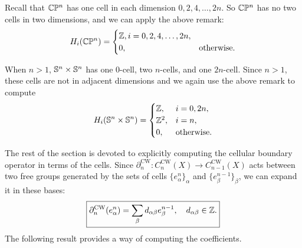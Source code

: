\begin{example}
    Recall that $\mathbb{C}\mathbb{P}^n$ has one cell in each dimension $0,2,4,\ldots,2n$. So $\mathbb{C}\mathbb{P}^n$ has no two cells in two dimensions, and we can apply the above remark:
    \[H_i(\mathbb{C}\mathbb{P}^n)=\begin{cases}
        \mathbb{Z}, i=0,2,4,\ldots,2n,\\
        0,&\text{otherwise}.
    \end{cases}\]
\end{example}
\begin{example}
    When $n>1$, $\mathbb{S}^n\times \mathbb{S}^n$ has one $0$-cell, two $n$-cells, and one $2n$-cell. Since $n>1$, these cells are not in adjacent dimensions and we again use the above remark to compute
    \[H_i(\mathbb{S}^n\times \mathbb{S}^n)=\begin{cases}
        \mathbb{Z},& i=0,2n,\\
        \mathbb{Z}^2,&i=n,\\
        0,&\text{otherwise}.
    \end{cases}\]
\end{example}


The rest of the section is devoted to explicitly computing the cellular boundary operator in terms of the cells. Since $\partial_n^{\mathrm{CW}}:C_n^{\mathrm{CW}}(X)\to C_{n-1}^{\mathrm{CW}}(X)$ acts between two free groups generated by the sets of cells $\{e^n_\alpha\}_\alpha$ and $\{e^{n-1}_\beta\}_\beta$, we can expand it in these bases:
\[\boxed{\partial_n^{\mathrm{CW}}(e_\alpha^n)=\sum_\beta d_{\alpha\beta}e_\beta^{n-1},\quad d_{\alpha\beta}\in\mathbb{Z}.}\]
The following result provides a way of computing the coefficients.

